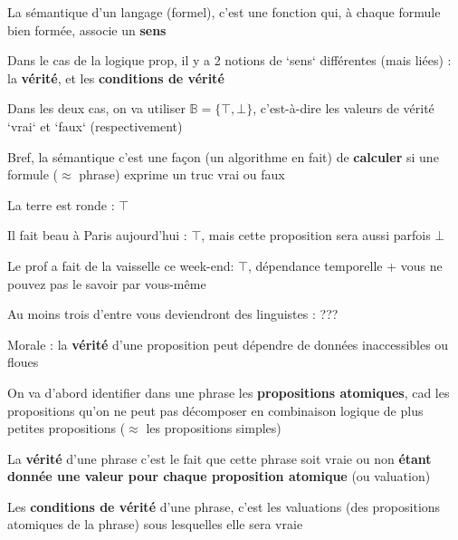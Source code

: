 \begin{frame}
	
La sémantique d'un langage (formel), c'est une fonction qui, à chaque formule bien formée, associe un \textbf{sens}\pause\newline

Dans le cas de la logique prop, il y a 2 notions de `sens` différentes (mais liées) : la \textbf{vérité}, et les \textbf{conditions de vérité}\pause\newline

Dans les deux cas, on va utiliser $\mathbb{B} = \{\top,\bot\}$, c'est-à-dire les valeurs de vérité `vrai` et `faux` (respectivement)\pause\newline

Bref, la sémantique c'est une façon (un algorithme en fait) de \textbf{calculer} si une formule  ($\approx$ phrase) exprime un truc vrai ou faux

\end{frame}



\begin{frame}
	
		La terre est ronde \pause : $\top$\pause\newline
	
		Il fait beau à Paris aujourd'hui \pause : $\top$\pause, mais cette proposition sera aussi parfois $\bot$\pause\newline
		
		Le prof a fait de la vaisselle ce week-end\pause : $\top$\pause, dépendance temporelle \pause + vous ne pouvez pas le savoir par vous-même\pause\newline
		
		Au moins trois d'entre vous deviendront des linguistes \pause : ???\pause\newline
		
		Morale : la \textbf{vérité} d'une proposition peut dépendre de données inaccessibles ou floues
	
\end{frame}

\begin{frame}
	
On va d'abord identifier dans une phrase les \textbf{propositions atomiques}, cad les propositions qu'on ne peut pas décomposer en combinaison logique de plus petites propositions ($\approx$ les propositions simples)\pause\newline

La \textbf{vérité} d'une phrase c'est le fait que cette phrase soit vraie ou non \textbf{étant donnée une valeur pour chaque proposition atomique} (ou valuation)\pause\newline

Les \textbf{conditions de vérité} d'une phrase, c'est les valuations (des propositions atomiques de la phrase) sous lesquelles elle sera vraie

\end{frame}

